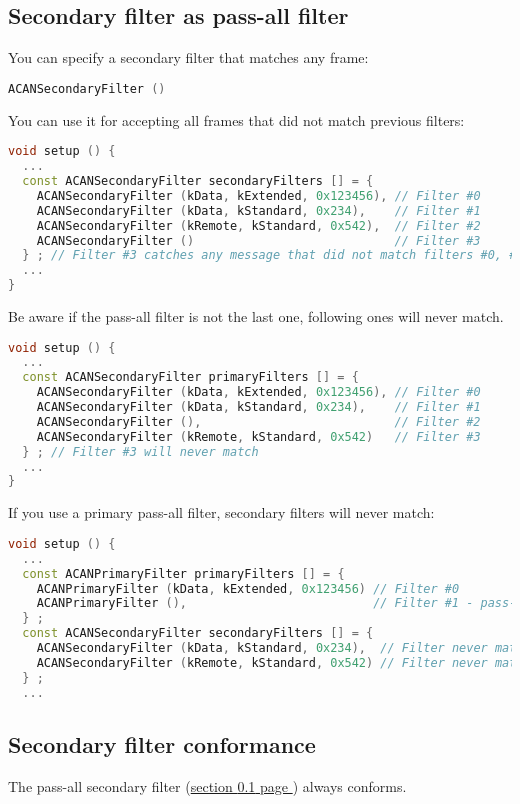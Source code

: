 \documentclass[10pt, a4paper, obeyspaces, openany]{extarticle}
\newcommand \subsectionLabel[2]{\subsection{#1}\label{subsec:#2}}
\newcommand\refSubsectionPage[1]{\hyperref[subsec:#1]{section \ref*{subsec:#1} page \pageref{subsec:#1}}}
\begin{document}
\subsectionLabel{Secondary filter as pass-all filter}{passAllSecondaryFilter}

You can specify a secondary filter that matches any frame: 
{ \small\begin{lstlisting}[language=c++]
    ACANSecondaryFilter ()
\end{lstlisting}}

You can use it for accepting all frames that did not match previous filters:
{ \small\begin{lstlisting}[language=c++]
void setup () {
  ...
  const ACANSecondaryFilter secondaryFilters [] = {
    ACANSecondaryFilter (kData, kExtended, 0x123456), // Filter #0
    ACANSecondaryFilter (kData, kStandard, 0x234),    // Filter #1
    ACANSecondaryFilter (kRemote, kStandard, 0x542),  // Filter #2
    ACANSecondaryFilter ()                            // Filter #3
  } ; // Filter #3 catches any message that did not match filters #0, #1 and #2
  ...
}
\end{lstlisting}}

Be aware if the pass-all filter is not the last one, following ones will never match.
{ \small\begin{lstlisting}[language=c++]
void setup () {
  ...
  const ACANSecondaryFilter primaryFilters [] = {
    ACANSecondaryFilter (kData, kExtended, 0x123456), // Filter #0
    ACANSecondaryFilter (kData, kStandard, 0x234),    // Filter #1
    ACANSecondaryFilter (),                           // Filter #2
    ACANSecondaryFilter (kRemote, kStandard, 0x542)   // Filter #3
  } ; // Filter #3 will never match
  ...
}
\end{lstlisting}}

If you use a primary pass-all filter, secondary filters will never match:
{ \small\begin{lstlisting}[language=c++]
void setup () {
  ...
  const ACANPrimaryFilter primaryFilters [] = {
    ACANPrimaryFilter (kData, kExtended, 0x123456) // Filter #0
    ACANPrimaryFilter (),                          // Filter #1 - pass-all
  } ;
  const ACANSecondaryFilter secondaryFilters [] = {
    ACANSecondaryFilter (kData, kStandard, 0x234),  // Filter never matches
    ACANSecondaryFilter (kRemote, kStandard, 0x542) // Filter never matches
  } ;
  ...
\end{lstlisting}}



\subsectionLabel{Secondary filter conformance}{secondaryFilterConformance}

The pass-all secondary filter (\refSubsectionPage{passAllSecondaryFilter}) always conforms.
\end{document}
